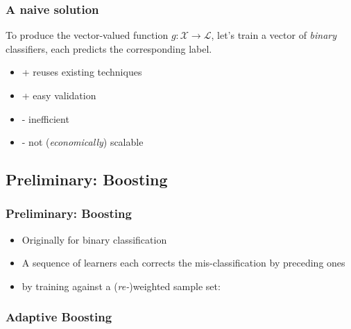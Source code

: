 \documentclass{beamer}
\begin{document}
\begin{frame}
\frametitle{A naive solution}
\begin{block}{}
To produce the vector-valued function $g : \mathcal{X} \rightarrow \mathcal{L}$, let's train a vector of \textit{binary} classifiers, each predicts the corresponding label.
\end{block}

\begin{block}{}
\begin{itemize}
\item + reuses existing techniques
\item + easy validation
\item - inefficient
\item - not (\textit{economically}) scalable
\end{itemize}
\end{block}
\end{frame}

\subsection{Preliminary: Boosting}

\begin{frame}
\frametitle{Preliminary: Boosting}
\begin{itemize}
\item Originally for binary classification
\item A sequence of learners each corrects the mis-classification by preceding ones
\item by training against a (\textit{re-})weighted sample set:
\end{itemize}
\end{frame}

\begin{frame}
\frametitle{Adaptive Boosting}

\begin{algorithm}[H]
\end{algorithm}

\end{frame}
\end{document}
